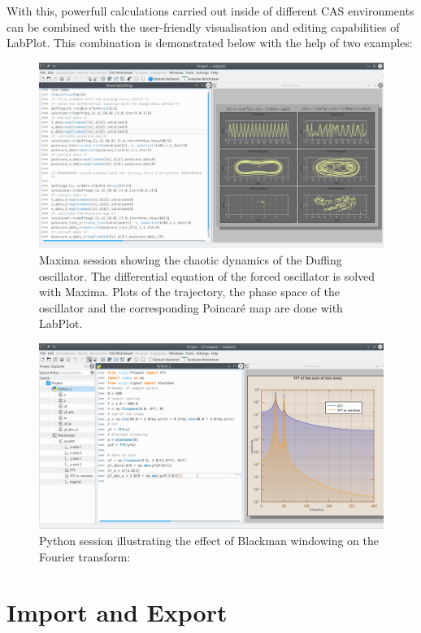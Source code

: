 With this, powerfull calculations carried out inside of different CAS environments can be combined with the user-friendly visualisation and editing capabilities of LabPlot. This combination is demonstrated below with the help of two examples:
\begin{figure}
\includegraphics[width=\textwidth]{images/maxima_session.png}
\caption{Maxima session showing the chaotic dynamics of the Duffing oscillator. The differential equation of the forced oscillator is solved with Maxima. Plots of the trajectory, the phase space of the oscillator and the corresponding Poincaré map are done with LabPlot.}
\end{figure}

\begin{figure}
\includegraphics[width=\textwidth]{images/python_session.png}
\caption{Python session illustrating the effect of Blackman windowing on the Fourier transform:}
\end{figure}



\chapter{Import and Export}
